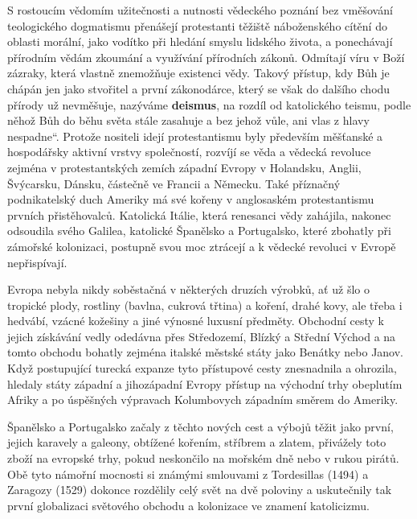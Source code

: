     S rostoucím vědomím užitečnosti a nutnosti vědeckého poznání bez vměšování teologického
    dogmatismu přenášejí protestanti těžiště náboženského cítění do oblasti morální, jako vodítko
    při hledání smyslu lidského života, a ponechávají přírodním vědám zkoumání a využívání
    přírodních zákonů. Odmítají víru v Boží zázraky, která vlastně znemožňuje existenci vědy. Takový
    přístup, kdy Bůh je chápán jen jako stvořitel a první zákonodárce, který se však do dalšího
    chodu přírody už nevměšuje, nazýváme \textbf{deismus}, na rozdíl od katolického teismu, podle
    něhož Bůh do běhu světa stále zasahuje a bez jehož vůle, ani vlas z hlavy nespadne“. Protože
    nositeli idejí protestantismu byly především měšťanské a hospodářsky aktivní vrstvy společností,
    rozvíjí se věda a vědecká revoluce zejména v protestantských zemích západní Evropy v Holandsku,
    Anglii, Švýcarsku, Dánsku, částečně ve Francii a Německu. Také příznačný podnikatelský duch
    Ameriky má své kořeny v anglosaském protestantismu prvních přistěhovalců. Katolická Itálie,
    která renesanci vědy zahájila, nakonec odsoudila svého Galilea, katolické Španělsko a
    Portugalsko, které zbohatly při zámořské kolonizaci, postupně svou moc ztrácejí a k vědecké
    revoluci v Evropě nepřispívají.

    Evropa nebyla nikdy soběstačná v některých druzích výrobků, ať už šlo o tropické plody, rostliny
    (bavlna, cukrová třtina) a koření, drahé kovy, ale třeba i hedvábí, vzácné kožešiny a jiné
    výnosné luxusní předměty. Obchodní cesty k jejich získávání vedly odedávna přes Středozemí,
    Blízký a Střední Východ a na tomto obchodu bohatly zejména italské městské státy jako Benátky
    nebo Janov. Když postupující turecká expanze tyto přístupové cesty znesnadnila a ohrozila,
    hledaly státy západní a jihozápadní Evropy přístup na východní trhy obeplutím Afriky a po
    úspěšných výpravach Kolumbovych západním směrem do Ameriky.

    Španělsko a Portugalsko začaly z těchto nových cest a výbojů těžit jako první, jejich karavely a
    galeony, obtížené kořením, stříbrem a zlatem, přivážely toto zboží na evropské trhy, pokud
    neskončilo na mořském dně nebo v rukou pirátů. Obě tyto námořní mocnosti si známými smlouvami z
    Tordesillas (1494) a Zaragozy (1529) dokonce rozdělily celý svět na dvě poloviny a uskutečnily
    tak první globalizaci světového obchodu a kolonizace ve znamení katolicizmu.

